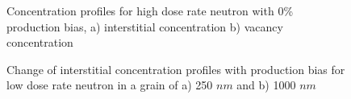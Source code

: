 \documentclass[a4paper]{article}
\begin{document}
\begin{figure}[htb!]
      \caption{Concentration profiles for high dose rate neutron with 0\% production bias, a) interstitial concentration b) vacancy concentration}
      \label{figure:concentrations_neutron_5_1e-3}
    \end{figure}

    \begin{figure}[htb!]  %
      \centering
      \qquad
      \caption{Change of interstitial concentration profiles with production bias for low dose rate neutron in a grain of a) 250 $nm$ and b) 1000 $nm$ }
      \label{figure:3D_concentrations_neutron_1e-6}
    \end{figure}
\end{document}
